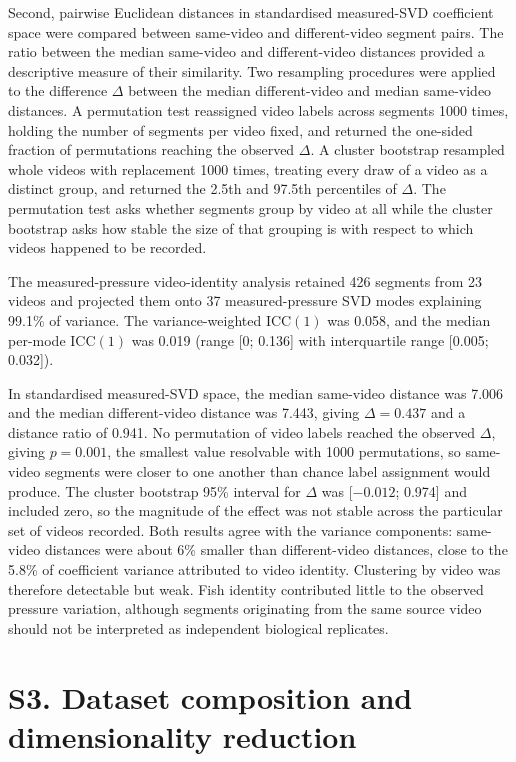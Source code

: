 \documentclass[11pt,a4paper]{article}
\begin{document}
Second, pairwise Euclidean distances in standardised measured-SVD coefficient space were compared between same-video and different-video segment pairs. The ratio between the median same-video and different-video distances provided a descriptive measure of their similarity. Two resampling procedures were applied to the difference \(\Delta\) between the median different-video and median same-video distances. A permutation test reassigned video labels across segments 1000 times, holding the number of segments per video fixed, and returned the one-sided fraction of permutations reaching the observed \(\Delta\). A cluster bootstrap resampled whole videos with replacement 1000 times, treating every draw of a video as a distinct group, and returned the 2.5th and 97.5th percentiles of \(\Delta\). The permutation test asks whether segments group by video at all while the cluster bootstrap asks how stable the size of that grouping is with respect to which videos happened to be recorded.

The measured-pressure video-identity analysis retained 426 segments from 23 videos and projected them onto 37 measured-pressure SVD modes explaining 99.1\% of variance. The variance-weighted \(\mathrm{ICC}(1)\) was 0.058, and the median per-mode \(\mathrm{ICC}(1)\) was 0.019 (range [0; 0.136] with interquartile range [0.005; 0.032]).

In standardised measured-SVD space, the median same-video distance was 7.006 and the median different-video distance was 7.443, giving \(\Delta=0.437\) and a distance ratio of 0.941. No permutation of video labels reached the observed \(\Delta\), giving \(p=0.001\), the smallest value resolvable with 1000 permutations, so same-video segments were closer to one another than chance label assignment would produce. The cluster bootstrap 95\% interval for \(\Delta\) was [\(-0.012\); 0.974] and included zero, so the magnitude of the effect was not stable across the particular set of videos recorded. Both results agree with the variance components: same-video distances were about 6\% smaller than different-video distances, close to the 5.8\% of coefficient variance attributed to video identity. Clustering by video was therefore detectable but weak. Fish identity contributed little to the observed pressure variation, although segments originating from the same source video should not be interpreted as independent biological replicates.

\section*{S3. Dataset composition and dimensionality reduction}
\end{document}
